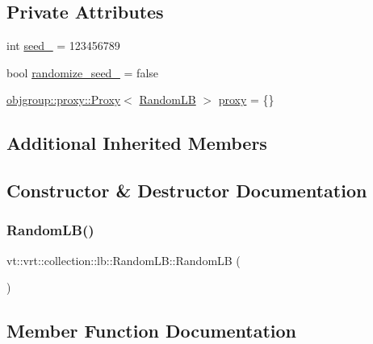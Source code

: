 \subsection*{Private Attributes}
\begin{DoxyCompactItemize}
\item 
int \hyperlink{structvt_1_1vrt_1_1collection_1_1lb_1_1_random_l_b_a1b7a01112ed2b0c38fb0c2887200d45a}{seed\+\_\+} = 123456789
\item 
bool \hyperlink{structvt_1_1vrt_1_1collection_1_1lb_1_1_random_l_b_af4968ddfd336c44bd2056e0096c24c8c}{randomize\+\_\+seed\+\_\+} = false
\item 
\hyperlink{structvt_1_1objgroup_1_1proxy_1_1_proxy}{objgroup\+::proxy\+::\+Proxy}$<$ \hyperlink{structvt_1_1vrt_1_1collection_1_1lb_1_1_random_l_b}{Random\+LB} $>$ \hyperlink{structvt_1_1vrt_1_1collection_1_1lb_1_1_random_l_b_a3aa850f295642d55b12c3274f752fc1a}{proxy} = \{\}
\end{DoxyCompactItemize}
\subsection*{Additional Inherited Members}


\subsection{Constructor \& Destructor Documentation}
\mbox{\label{structvt_1_1vrt_1_1collection_1_1lb_1_1_random_l_b_ac6bf4ed6fb55fb787478c5f00d68f20c}} 
\subsubsection{\texorpdfstring{Random\+L\+B()}{RandomLB()}}
{\footnotesize\ttfamily vt\+::vrt\+::collection\+::lb\+::\+Random\+L\+B\+::\+Random\+LB (\begin{DoxyParamCaption}{ }\end{DoxyParamCaption})\hspace{0.3cm}{\ttfamily [default]}}



\subsection{Member Function Documentation}
\mbox{\label{structvt_1_1vrt_1_1collection_1_1lb_1_1_random_l_b_a1b9a24043e9a971fc3acb47233028ca8}} 
